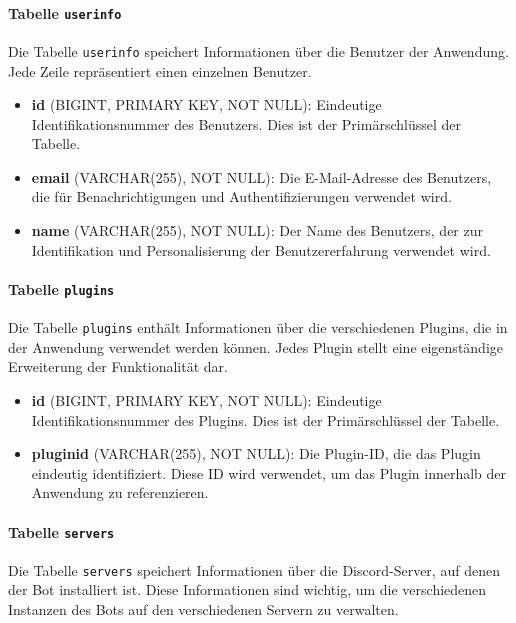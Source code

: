 \paragraph{\texorpdfstring{Tabelle \texttt{userinfo}}{Tabelle userinfo}}\label{tabelle-userinfo}

Die Tabelle \texttt{userinfo} speichert Informationen über die Benutzer der Anwendung. Jede Zeile repräsentiert einen einzelnen Benutzer.

\begin{itemize}
\item
  \textbf{id} (BIGINT, PRIMARY KEY, NOT NULL): Eindeutige Identifikationsnummer des Benutzers. Dies ist der Primärschlüssel der Tabelle.
\item
  \textbf{email} (VARCHAR(255), NOT NULL): Die E-Mail-Adresse des Benutzers, die für Benachrichtigungen und Authentifizierungen verwendet wird.
\item
  \textbf{name} (VARCHAR(255), NOT NULL): Der Name des Benutzers, der zur Identifikation und Personalisierung der Benutzererfahrung verwendet wird.
\end{itemize}

\paragraph{\texorpdfstring{Tabelle \texttt{plugins}}{Tabelle plugins}}\label{tabelle-plugins}

Die Tabelle \texttt{plugins} enthält Informationen über die verschiedenen Plugins, die in der Anwendung verwendet werden können. Jedes Plugin stellt eine eigenständige Erweiterung der Funktionalität dar.

\begin{itemize}
\item
  \textbf{id} (BIGINT, PRIMARY KEY, NOT NULL): Eindeutige Identifikationsnummer des Plugins. Dies ist der Primärschlüssel der Tabelle.
\item
  \textbf{pluginid} (VARCHAR(255), NOT NULL): Die Plugin-ID, die das Plugin eindeutig identifiziert. Diese ID wird verwendet, um das Plugin innerhalb der Anwendung zu referenzieren.
\end{itemize}

\paragraph{\texorpdfstring{Tabelle \texttt{servers}}{Tabelle servers}}\label{tabelle-servers}

Die Tabelle \texttt{servers} speichert Informationen über die Discord-Server, auf denen der Bot installiert ist. Diese Informationen sind wichtig, um die verschiedenen Instanzen des Bots auf den verschiedenen Servern zu verwalten.

